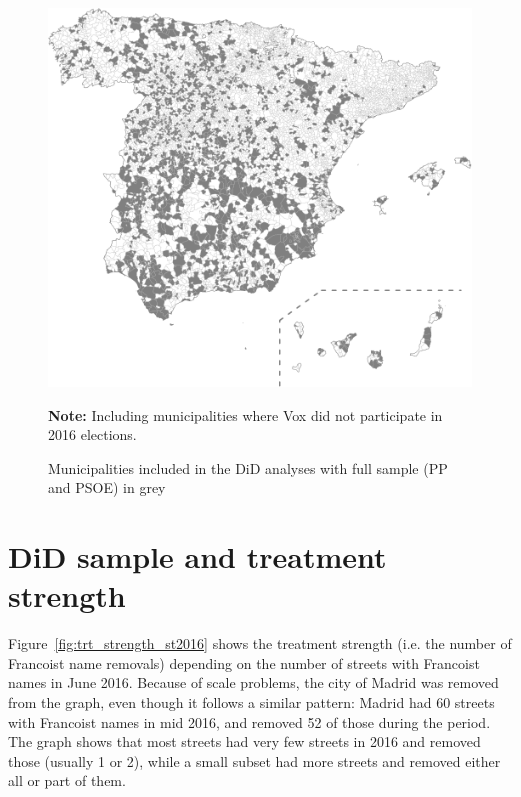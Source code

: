 \documentclass[12pt, titlepage]{article}
\begin{document}
\begin{figure}[htb!]
\centering

  \includegraphics[width = \textwidth]{img/map_full}

  \caption{Municipalities included in the DiD analyses with full sample (PP and PSOE) in grey}\label{fig:map_full}

    \vspace{5pt}

    \parbox[t]{1\textwidth}{\footnotesize{\textbf{Note:} Including municipalities where Vox did not participate in 2016 elections.}}

\end{figure}


\clearpage
\section{DiD sample and treatment strength}\label{app:treatment_strength}

Figure~\ref{fig:trt_strength_st2016} shows the treatment strength (i.e. the number of Francoist name removals) depending on the number of streets with Francoist names in June 2016. Because of scale problems, the city of Madrid was removed from the graph, even though it follows a similar pattern: Madrid had 60 streets with Francoist names in mid 2016, and removed 52 of those during the period.
The graph shows that most streets had very few streets in 2016 and removed those (usually 1 or 2), while a small subset had more streets and removed either all or part of them.
\end{document}
